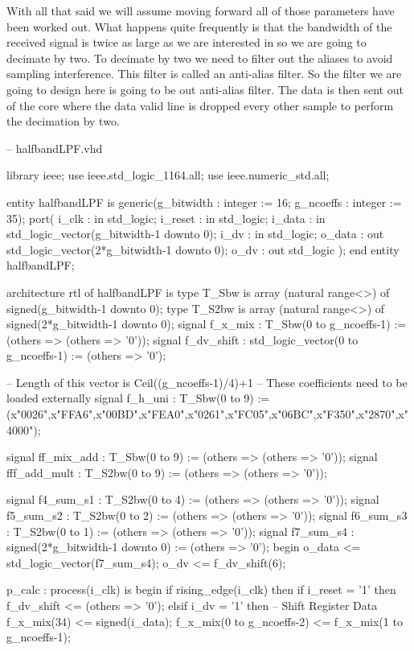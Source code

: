 With all that said we will assume moving forward all of those parameters have been worked out. What happens quite frequently is that the bandwidth of the received signal is twice as large as we are interested in so we are going to decimate by two. To decimate by two we need to filter out the aliases to avoid sampling interference. This filter is called an anti-alias filter. So the filter we are going to design here is going to be out anti-alias filter. The data is then sent out of the core where the data valid line is dropped every other sample to perform the decimation by two. 

\begin{VHDLlisting}[tabsize=2]
-- halfbandLPF.vhd

library ieee;
	use ieee.std_logic_1164.all;
	use ieee.numeric_std.all;
	
entity halfbandLPF is 
	generic(g_bitwidth : integer := 16;
	        g_ncoeffs  : integer := 35);
	port(
			i_clk      : in    std_logic;
			i_reset    : in    std_logic;
			i_data     : in    std_logic_vector(g_bitwidth-1 downto 0);
			i_dv       : in    std_logic;
			o_data     :   out std_logic_vector(2*g_bitwidth-1 downto 0);
			o_dv       :   out std_logic	
	);
end entity halfbandLPF;

architecture rtl of halfbandLPF is 
	type T_Sbw is array (natural range<>) of signed(g_bitwidth-1 downto 0);
	type T_S2bw is array (natural range<>) of signed(2*g_bitwidth-1 downto 0);
	signal f_x_mix    : T_Sbw(0 to g_ncoeffs-1) := (others => (others => '0'));
	signal f_dv_shift : std_logic_vector(0 to g_ncoeffs-1) := (others => '0');
	
	-- Length of this vector is Ceil((g_ncoeffs-1)/4)+1
	-- These coefficients need to be loaded externally
	signal f_h_uni      : T_Sbw(0 to 9) := (x"0026",x"FFA6",x"00BD",x"FEA0",x"0261",x"FC05",x"06BC",x"F350",x"2870",x"4000");

	signal ff_mix_add   : T_Sbw(0 to 9) := (others => (others => '0'));
	signal fff_add_mult : T_S2bw(0 to 9) := (others => (others => '0'));
	
	signal f4_sum_s1    : T_S2bw(0 to 4) := (others => (others => '0'));
	signal f5_sum_s2    : T_S2bw(0 to 2) := (others => (others => '0'));
	signal f6_sum_s3    : T_S2bw(0 to 1) := (others => (others => '0'));
	signal f7_sum_s4    : signed(2*g_bitwidth-1 downto 0) := (others => '0');
begin
	o_data <= std_logic_vector(f7_sum_s4);
	o_dv <= f_dv_shift(6);

	p_calc : process(i_clk) is
	begin
		if rising_edge(i_clk) then
			if i_reset = '1' then
				f_dv_shift <= (others => '0');
			elsif i_dv = '1' then
				-- Shift Register Data
				f_x_mix(34) <= signed(i_data);
				f_x_mix(0 to g_ncoeffs-2) <= f_x_mix(1 to g_ncoeffs-1);
				

\end{VHDLlisting}
